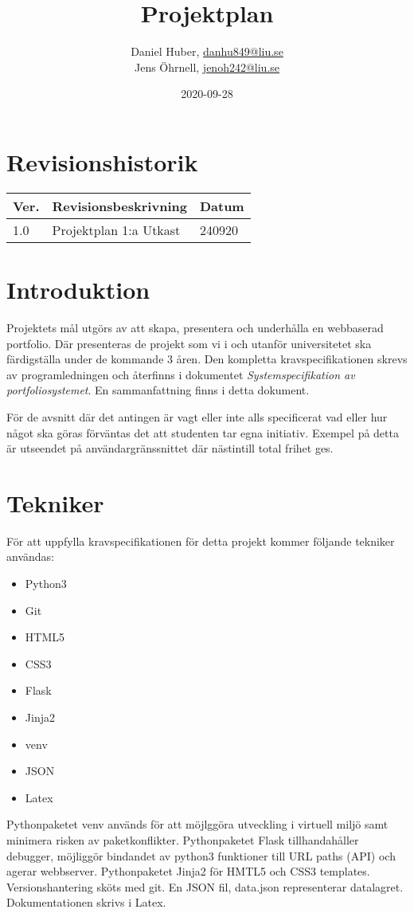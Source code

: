 \documentclass{TDP003mall}
\author{Daniel Huber, \url{danhu849@liu.se}\\
	Jens Öhrnell, \url{jenoh242@liu.se}}
\title{Projektplan}
\date{2020-09-28}
\begin{document}
\projectpage

\tableofcontents

\newpage
\section{Revisionshistorik}
\begin{table}[!h]
\begin{tabularx}{\linewidth}{|X|X|X|}
\hline
  Ver. & Revisionsbeskrivning & Datum \\\hline
  1.0 & Projektplan 1:a Utkast & 240920\\\hline
\end{tabularx}
\end{table}


\section{Introduktion}
Projektets mål utgörs av att skapa, presentera och underhålla en webbaserad portfolio. Där presenteras de projekt som vi i och utanför universitetet ska färdigställa under de kommande 3 åren. Den kompletta kravspecifikationen skrevs av programledningen och återfinns i dokumentet \textit{Systemspecifikation av portfoliosystemet}. En sammanfattning finns i detta dokument.

För de avsnitt där det antingen är vagt eller inte alls specificerat vad eller hur något ska göras förväntas det att studenten tar egna initiativ. Exempel på detta är utseendet på användargränssnittet där nästintill total frihet ges.

\section{Tekniker}
För att uppfylla kravspecifikationen för detta projekt kommer följande tekniker användas:
\begin{itemize}
\item Python3
\item Git
\item HTML5
\item CSS3
\item Flask
\item Jinja2
\item venv
\item JSON
\item Latex
\end{itemize}

Pythonpaketet venv används för att möjlggöra utveckling i virtuell miljö samt minimera risken av paketkonflikter.
Pythonpaketet Flask tillhandahåller debugger, möjliggör bindandet av python3 funktioner till URL paths (API) och agerar webbserver.
Pythonpaketet Jinja2 för HMTL5 och CSS3 templates.
Versionshantering sköts med git.
En JSON fil, data.json representerar datalagret.
Dokumentationen skrivs i Latex.
\end{document}
